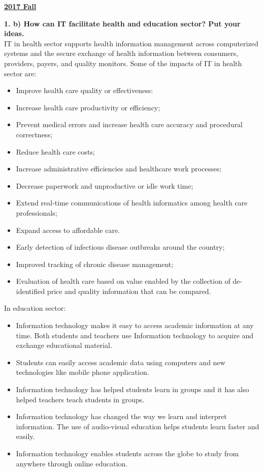 \documentclass [12pt, a4paper]{article}
\begin{document}
\large
\begin{center}
	\textbf{\underline{2017 Fall}}\\
\end{center}

\large
\textbf{1. b) How can IT facilitate health and education sector? Put your ideas.}\\
\normalsize
IT in health sector supports health information management across computerized systems and the secure exchange of health information between consumers, providers, payers, and quality monitors. Some of the impacts of IT in health sector are:

\begin{itemize}
	\item Improve health care quality or effectiveness:
	\item Increase health care productivity or efficiency;
	\item Prevent medical errors and increase health care accuracy and procedural correctness;
	\item Reduce health care costs;
	\item Increase administrative efficiencies and healthcare work processes;
	\item Decrease paperwork and unproductive or idle work time;
	\item Extend real-time communications of health informatics among health care professionals; 
	\item Expand access to affordable care.
	\item Early detection of infectious disease outbreaks around the country;
	\item Improved tracking of chronic disease management;
	\item Evaluation of health care based on value enabled by the collection of de-identified price and quality information that can be compared.

\end{itemize}

In education sector:
\begin{itemize}
	\item Information technology makes it easy to access academic information at any time. Both students and teachers use Information technology to acquire and exchange educational material. 
	\item Students can easily access academic data using computers and new technologies like mobile phone application.
	\item Information technology has helped students learn in groups and it has also helped teachers teach students in groups.
	\item Information technology has changed the way we learn and interpret information. The use of audio-visual education helps students learn faster and easily.
	\item Information technology enables students across the globe to study from anywhere through online education.
\end{itemize}
\end{document}
